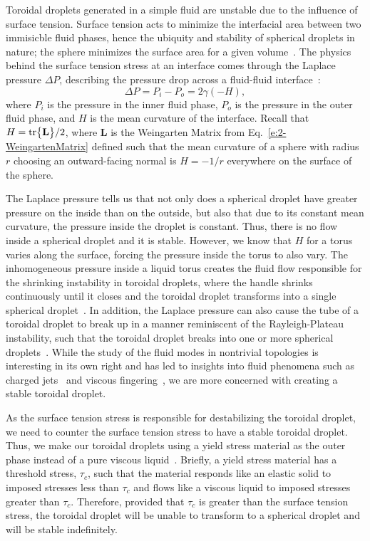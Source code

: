 Toroidal droplets generated in a simple fluid are unstable due to the influence of surface tension.
Surface tension acts to minimize the interfacial area between two immisicble fluid phases, hence the ubiquity and stability of spherical droplets in nature; the sphere minimizes the surface area for a given volume~\cite{RN178}.
The physics behind the surface tension stress at an interface comes through the Laplace pressure $\Delta P$, describing the pressure drop across a fluid-fluid interface~\cite{RN178}:
\begin{equation}\label{e:3-LapPres}
  \Delta P = P_i - P_o = 2 \gamma (- H),
\end{equation}
where $P_i$ is the pressure in the inner fluid phase, $P_o$ is the pressure in the outer fluid phase, and $H$ is the mean curvature of the interface.
Recall that $H = \textup{tr}\big \{ \mathbf{L} \big \}/2$, where $\mathbf{L}$ is the Weingarten Matrix from Eq.~\ref{e:2-WeingartenMatrix} defined such that the mean curvature of a sphere with radius $r$ choosing an outward-facing normal is $H = -1/r$ everywhere on the surface of the sphere.

The Laplace pressure tells us that not only does a spherical droplet have greater pressure on the inside than on the outside, but also that due to its constant mean curvature, the pressure inside the droplet is constant.
Thus, there is no flow inside a spherical droplet and it is stable.
However, we know that $H$ for a torus varies along the surface, forcing the pressure inside the torus to also vary.
The inhomogeneous pressure inside a liquid torus creates the fluid flow responsible for the shrinking instability in toroidal droplets, where the handle shrinks continuously until it closes and the toroidal droplet transforms into a single spherical droplet~\cite{RN29,RN255}.
In addition, the Laplace pressure can also cause the tube of a toroidal droplet to break up in a manner reminiscent of the Rayleigh-Plateau instability, such that the toroidal droplet breaks into one or more spherical droplets~\cite{RN29,RN256}.
While the study of the fluid modes in nontrivial topologies is interesting in its own right and has led to insights into fluid phenomena such as charged jets~\cite{RN256} and viscous fingering~\cite{RN254}, we are more concerned with creating a stable toroidal droplet.

As the surface tension stress is responsible for destabilizing the toroidal droplet, we need to counter the surface tension stress to have a stable toroidal droplet.
Thus, we make our toroidal droplets using a yield stress material as the outer phase instead of a pure viscous liquid~\cite{RN47,RN258}.
Briefly, a yield stress material has a threshold stress, $\tau_c$, such that the material responds like an elastic solid to imposed stresses less than $\tau_c$ and flows like a viscous liquid to imposed stresses greater than $\tau_c$.
Therefore, provided that $\tau_c$ is greater than the surface tension stress, the toroidal droplet will be unable to transform to a spherical droplet and will be stable indefinitely.

